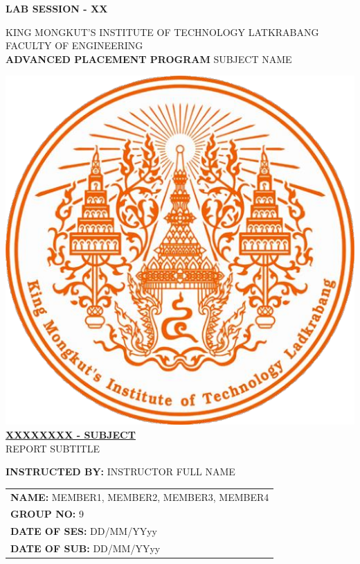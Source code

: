 \def\SESSION {LAB SESSION - XX}
\def\TITLE {
	KING MONGKUT'S INSTITUTE OF TECHNOLOGY LATKRABANG\\
	FACULTY OF ENGINEERING\\
	\textbf{ADVANCED PLACEMENT PROGRAM} SUBJECT NAME
}
\def\SUBTITLE {REPORT SUBTITLE}
\def\SUBJECT {XXXXXXXX - SUBJECT}
\def\INSTRUCTOR {INSTRUCTOR FULL NAME}
\def\SUBMISSION {
	\textbf{NAME:} MEMBER1, MEMBER2, MEMBER3, MEMBER4\\
	\textbf{GROUP NO:} 9\\
	\textbf{DATE OF SES:} DD/MM/YYyy\\
	\textbf{DATE OF SUB:} DD/MM/YYyy\\
}

\begin{center}
	\vspace*{-71.42pt}\hfill\textbf{\SESSION}\\[1cm]
	\vspace{5pt}
	\begin{minipage}[t][1.21in][t]{\textwidth}
		\begin{center}
			\TITLE
		\end{center}
	\end{minipage}
	\includegraphics[scale=0.34]{assets/Ladkrabang.png}\\[60pt]
	\underline{\textbf{\SUBJECT}}\\
	\vspace{15pt}
	\SUBTITLE
\end{center}
\vfill
\textbf{INSTRUCTED BY:} \INSTRUCTOR\\[40pt]
\null\hfill
\begin{tabular}{ l }
	\SUBMISSION
\end{tabular}

